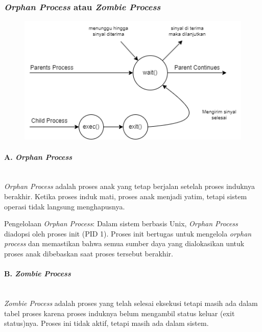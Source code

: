 \documentclass[12pt]{article}
\begin{document}
\begin{itemize}
    \subsubsection{\textit{Orphan Process} atau \textit{Zombie Process}}

    \begin{figure}[h]
	\centering
	\includegraphics[width=1\textwidth]{asset/Process.png}
	\label{fig:gambar}
    \end{figure}

    \paragraph{A. \textit{Orphan Process}} \mbox{} \\
    \textit{Orphan Process} adalah proses anak yang tetap berjalan setelah proses induknya berakhir. Ketika proses induk mati, proses anak menjadi yatim, tetapi sistem operasi tidak langsung menghapusnya.

    Pengelolaan \textit{Orphan Process}:  
    Dalam sistem berbasis Unix, \textit{Orphan Process} diadopsi oleh proses init (PID 1). Proses init bertugas untuk mengelola \textit{orphan process} dan memastikan bahwa semua sumber daya yang dialokasikan untuk proses anak dibebaskan saat proses tersebut berakhir.

    \paragraph{B. \textit{Zombie Process}} \mbox{} \\
    \textit{Zombie Process} adalah proses yang telah selesai eksekusi tetapi masih ada dalam tabel proses karena proses induknya belum mengambil status keluar (exit status)nya. Proses ini tidak aktif, tetapi masih ada dalam sistem. 


\end{itemize}
\end{document}
